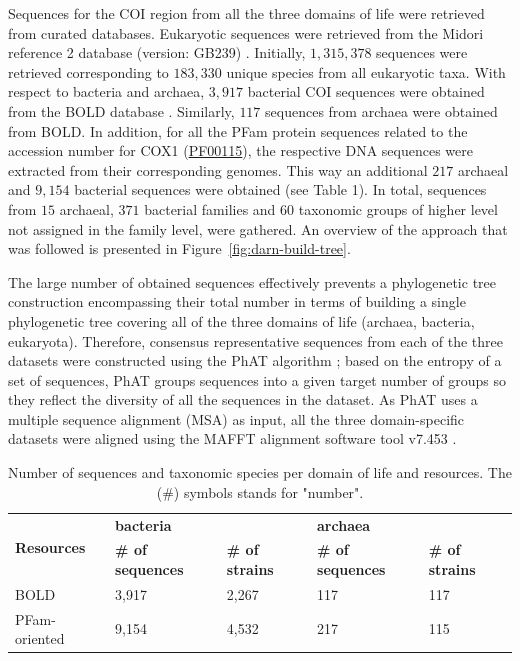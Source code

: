    Sequences for the COI region from all the three domains of life were retrieved from curated databases. 
   Eukaryotic sequences were retrieved from the Midori reference 2 database (version: GB239) \citep{machida2017metazoan}. 
   Initially, $1,315,378$ sequences were retrieved corresponding to $183,330$ unique species from all eukaryotic taxa. 
   With respect to bacteria and archaea, $3,917$ bacterial COI sequences were obtained from the BOLD database \citep{ratnasingham2007bold}. 
   Similarly, $117$ sequences from archaea were obtained from BOLD. 
   In addition, for all the PFam protein sequences related to the accession number for 
   COX1 (\href{http://www.ncbi.nlm.nih.gov/nuccore/PF00115}{PF00115}), the respective DNA sequences were extracted from their corresponding genomes. 
   This way an additional $217$ archaeal and $9,154$ bacterial sequences were obtained (see Table 1). 
   In total, sequences from $15$ archaeal, $371$ bacterial families and 60 taxonomic groups of higher level not assigned in the family level, were gathered. 
   An overview of the approach that was followed is presented in Figure~\ref{fig:darn-build-tree}. 

   The large number of obtained sequences effectively prevents a phylogenetic tree construction encompassing their total number in terms of building a single phylogenetic tree covering all of the three domains of life (archaea, bacteria, eukaryota). 
   Therefore, consensus representative sequences from each of the three datasets were constructed using 
   the PhAT algorithm \citep{czech2019methods}; 
   based on the entropy of a set of sequences, PhAT groups sequences into a given target number of groups so they reflect the diversity of all the sequences in the dataset. 
   As PhAT uses a multiple sequence alignment (MSA) as input, all the three domain-specific datasets were aligned using the MAFFT alignment software tool v7.453 \citep{katoh2002mafft, nakamura2018parallelization}.
   
   \begin{table}[h]
      \begin{tabular}{@{}lllll@{}}
      \toprule
      \multirow{2}{*}{\textbf{Resources}} & \multicolumn{2}{l}{\textbf{bacteria}} & \multicolumn{2}{l}{\textbf{archaea}} \\ \cmidrule(l){2-5} 
      & \textbf{\# of sequences} & \textbf{\# of strains} & \textbf{\# of sequences} & \textbf{\# of strains} \\ \cmidrule(r){1-1}
      BOLD & 3,917 & 2,267 & 117 & 117 \\
      PFam-oriented & 9,154 & 4,532 & 217 & 115 \\ \bottomrule
      \end{tabular}
      \caption[Number of sequences and taxonomic species per domain of life and resources]{Number of sequences and taxonomic species per domain of life and resources. The (\#) symbols stands for "number".}
      \label{table:darn-seq-per-domain}
   \end{table}


